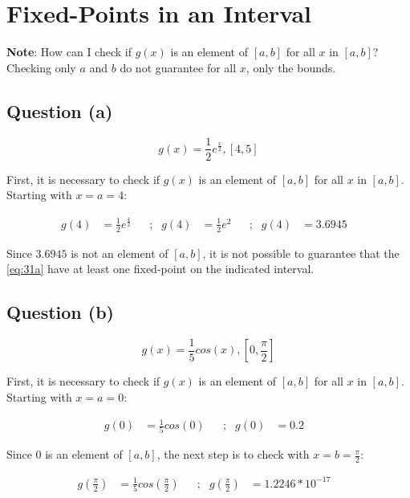 \section{Fixed-Points in an Interval}

	\textbf{Note}: How can I check if $g(x)$ is an element of $[a,b]$ for all $x$ in $[a,b]$? Checking only $a$ and $b$ do not guarantee for all $x$, only the bounds.
	
	\subsection{Question (a)}
	
	\begin{equation}
		g(x) = \frac{1}{2}e^{\frac{x}{2}},[4,5]
	\label{eq:31a}
	\end{equation}
	
	First, it is necessary to check if $g(x)$ is an element of $[a,b]$ for all $x$ in $[a,b]$. Starting with $x = a = 4$:
	
	\begin{align}
		g(4) &= \frac{1}{2}e^{\frac{4}{2}}& &;&
		g(4) &= \frac{1}{2}e^{2}& &;&
		g(4) &= 3.6945&
	\label{eq:31a4x}
	\end{align}

	Since $3.6945$ is not an element of $[a,b]$, it is not possible to guarantee that the \cref{eq:31a} have at least one fixed-point on the indicated interval.

	\subsection{Question (b)}
	
	\begin{equation}
		g(x) = \frac{1}{5}cos(x),\left[0,\frac{\pi}{2}\right]
	\label{eq:31b}
	\end{equation}
	
	First, it is necessary to check if $g(x)$ is an element of $[a,b]$ for all $x$ in $[a,b]$. Starting with $x = a = 0$:
	
	\begin{align}
		g(0) &= \frac{1}{5}cos(0)& &;&
		g(0) &= 0.2&
	\label{eq:31b0x}
	\end{align}

	Since $0$ is an element of $[a,b]$, the next step is to check with $x = b = \frac{\pi}{2}$:

	\begin{align}
		g\left(\frac{\pi}{2}\right) &= \frac{1}{5}cos\left(\frac{\pi}{2}\right)& &;& 
		g\left(\frac{\pi}{2}\right) &= 1.2246 * 10^{-17}&
	\label{eq:31bpix}
	\end{align}

